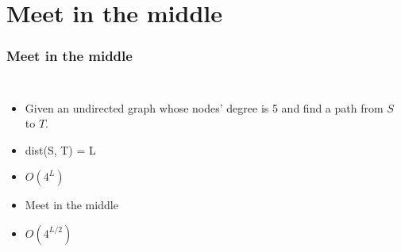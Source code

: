 \documentclass[landscape]{beamer}
\begin{document}
	\section{Meet in the middle}
	\begin{frame}[c]\frametitle{Meet in the middle}
		\begin{columns}
			\column{4cm}
			\begin{itemize}
				\item<1-> Given an undirected graph whose nodes' degree is 5 and find a path from $S$ to $T$.
				\item<2-> dist(S, T) = L
				\item<3-> $O(4^L)$
				\item<4-> Meet in the middle
				\item<4-> $O(4^{L/2})$
			\end{itemize}
			\column{6cm}
		\end{columns}
	\end{frame}
\end{document}
